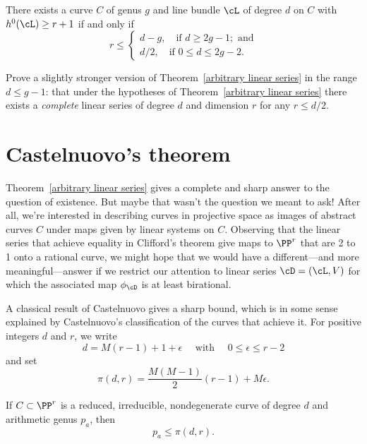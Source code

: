 \begin{theorem}\label{arbitrary linear series}
There exists a curve $C$ of genus $g$ and line bundle $\cL$ of degree $d$ on $C$ with $h^0(\cL) \geq r+1$ if and only if
$$
r \leq
\begin{cases}
d-g, \quad \text{if } d \geq 2g-1; \text{ and} \\
d/2,  \quad \text{if } 0 \leq d \leq 2g-2.
\end{cases}
$$
\end{theorem}

\begin{exercise}
Prove a slightly stronger version of Theorem~\ref{arbitrary linear series} in the range $d \leq g-1$: that under the hypotheses of Theorem~\ref{arbitrary linear series} there exists a \emph{complete} linear series of degree $d$ and dimension $r$ for any $r \leq d/2$.
\end{exercise}

\section{Castelnuovo's theorem}

Theorem~\ref{arbitrary linear series} gives a complete and sharp answer to the question of existence.
But maybe that wasn't the question we meant to ask! After all, we're interested in describing curves in projective space as images of abstract curves $C$ under maps given by linear systems on $C$. Observing that the linear series that achieve equality in Clifford's theorem give maps to $\PP^r$ that are 2 to 1 onto a rational curve, we might hope that we would have a different---and more meaningful---answer if we  restrict our attention to linear series $\cD = (\cL,V)$ for which the associated map $\phi_\cD$ is at least  birational. 

A classical result of Castelnuovo gives a sharp bound, which is in some sense explained by Castelnuovo's classification of the curves that achieve it. For positive integers $d$ and $r$, we write
$$
 d = M(r-1) + 1 + \epsilon \quad \text{ with } \quad 0 \leq \epsilon \leq r-2
$$
and set
$$
\pi(d,r) = \frac{M(M-1)}{2}(r-1) + M\epsilon.
$$

\begin{theorem}\label{Castelnuovo's bound}
If $C \subset \PP^r$ is a reduced, irreducible, nondegenerate curve of degree $d$ and arithmetic genus $p_a$, then
$$
p_a \leq \pi(d,r).
$$
\end{theorem}

